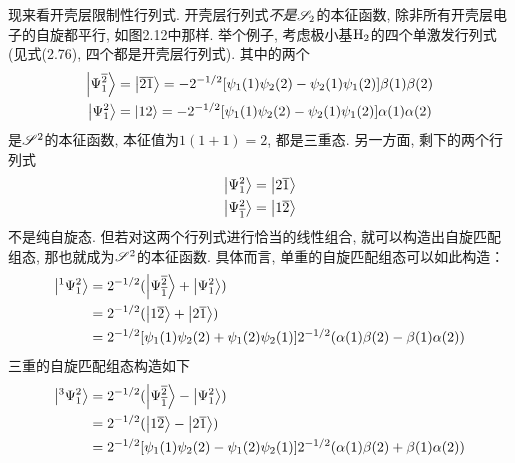现来看开壳层限制性行列式. 开壳层行列式\emph{不是}$\mathscr{S}_2$的本征函数, 除非所有开壳层电子的自旋都平行, 如图2.12中那样. 举个例子, 考虑极小基$\mathrm{H}_2$的四个单激发行列式(见式(2.76), 四个都是开壳层行列式). 其中的两个
\begin{subequations}
	\begin{align}
	\Ket{\Psi_1^{\overline{2}}} & = \Ket{\overline{2}\overline{1}} = -2^{-1/2}[\psi_1(1)\psi_2(2) - \psi_2(1)\psi_1(2)]\beta(1)\beta(2)\\
	\Ket{\Psi_1^{{2}}} & = \Ket{12}  = -2^{-1/2}[\psi_1(1)\psi_2(2) - \psi_2(1)\psi_1(2)]\alpha(1)\alpha(2)\\
	\end{align}
\end{subequations} 
是$\mathscr{S}^2$的本征函数, 本征值为$1(1+1)=2$, 都是三重态. 另一方面, 剩下的两个行列式
\begin{subequations}
	\begin{align}
	\Ket{\Psi_1^2} & = \Ket{2\overline{1}}\\
	\Ket{\Psi_{\overline{1}}^{2}} & = \Ket{1\overline{2}}
	\end{align}
\end{subequations} 
不是纯自旋态. 但若对这两个行列式进行恰当的线性组合, 就可以构造出自旋匹配组态, 那也就成为$\mathscr{S}^2$的本征函数. 具体而言, 单重的自旋匹配组态可以如此构造：
\begin{align}
\Ket{^1\Psi_1^2} & = 2^{-1/2}(\Ket{\Psi_{\overline{1}}^{\overline{2}}} + \Ket{\Psi_1^2}) \notag\\
& =2^{-1/2}(\Ket{1\overline{2}} + \Ket{2\overline{1}})\notag \\
& =2^{-1/2}[ \psi_1(1)\psi_2(2) + \psi_1(2)\psi_2(1)] 2^{-1/2}(\alpha(1)\beta(2) - \beta(1)\alpha(2))
\end{align}
三重的自旋匹配组态构造如下
\begin{align}
\Ket{^3\Psi_1^2} & = 2^{-1/2}(\Ket{\Psi_{\overline{1}}^{\overline{2}}} - \Ket{\Psi_1^2}) \notag\\
& =2^{-1/2}(\Ket{1\overline{2}} - \Ket{2\overline{1}})\notag \\
& =2^{-1/2}[ \psi_1(1)\psi_2(2) - \psi_1(2)\psi_2(1)] 2^{-1/2}(\alpha(1)\beta(2) + \beta(1)\alpha(2))
\end{align}


